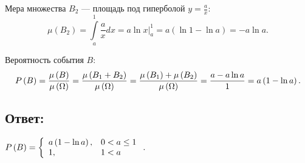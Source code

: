 \begin{enumerate}
    Мера множества $B_2$ --- площадь под гиперболой $y = \frac{a}{x}$:
    \begin{equation}
        \mu \left ( B_2 \right )
        = \int \limits_{a}^1 \frac{a}{x} dx
        = \left . a \ln x \right |_a^1
        = a \left ( \ln 1 - \ln a \right )
        = - a \ln a .
    \end{equation}

    Вероятность события $B$:
    \begin{equation}
        P \left ( B \right )
        = \frac{\mu \left ( B \right )}{\mu \left ( \Omega \right )}
        = \frac{\mu \left ( B_1 + B_2 \right )}{\mu \left ( \Omega \right )}
        = \frac{\mu \left ( B_1 \right ) + \mu \left ( B_2 \right )}{\mu \left ( \Omega \right )}
        = \frac{a - a \ln a}{1}
        = a \left ( 1 - \ln a \right ).
    \end{equation}
\end{enumerate}

\subsection*{Ответ:}
$
P \left ( B \right ) =
\left \{
\begin{array}{ll}
    a \left ( 1 - \ln a \right ), & 0 < a \le 1 \\
    1,         & 1 < a
\end{array}
\right .
.
$